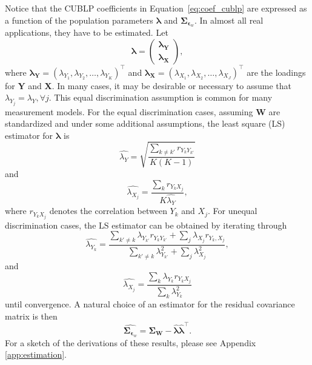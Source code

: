 \documentclass[man, floatsintext]{apa7}
\newcommand{\mbf}[1]{\bm{#1}}
\newcommand{\bX}{\mbf{X}}
\newcommand{\bY}{\mbf{Y}}
\newcommand{\beps}{\mbf{\epsilon}}
\newcommand{\blambda}{\mbf{\lambda}}
\newcommand{\bW}{\mbf{W}}
\begin{document}
  Notice that the CUBLP coefficients in Equation~\ref{eq:coef_cublp} are
  expressed as a function of the population parameters $\blambda$ and $
  \mbf{\Sigma}_{\beps_w}$. In almost all real applications, they have to be
  estimated. Let 
  \[ \blambda = \left (\begin{array}{r} \blambda_{\bY} \\
  \blambda_{\bX} \end{array} \right), \]
  where $\blambda_{\bY} = (\lambda_{Y_1},\lambda_{Y_2}, \dots, \lambda_
  {Y_K})^\top$ and $\blambda_{\bX} = (\lambda_{X_1}, \lambda_{X_2}, \dots,
  \lambda_{X_J})^\top$ are the loadings for $\bY$ and $\bX$.
  In many cases, it may be desirable or necessary to assume that $\lambda_{Y_j}
  = \lambda_Y, \forall j$. This equal discrimination assumption is common for
  many measurement models. For the equal discrimination cases, assuming $\bW$
  are standardized and under some additional assumptions, the least square (LS)
  estimator for $\blambda$ is
  \begin{equation}
    \hat{\lambda_Y} = \sqrt{\frac{\sum_{k \neq k'} r_{Y_k Y_{k'}}}{K(K-1)}}
  \end{equation}
  and
  \begin{equation}
    \hat{\lambda_{X_j}} = \frac{\sum_k r_{Y_k X_j}}{K\hat{\lambda_Y}},
  \end{equation}
  where $r_{Y_k X_j}$ denotes the correlation between $Y_k$ and $X_j$. For
  unequal discrimination cases, the LS estimator can be obtained by iterating
  through
  \begin{equation}
    \hat{\lambda_{Y_k}} = \frac{\sum_{k' \neq k} \lambda_{Y_{k'}} r_{Y_{k}Y_{k'}} +
    \sum_j \lambda_{X_j} r_{Y_k, X_j}}{\sum_{k' \neq k} \lambda_{Y_{k'}}^2 + \sum_j
    \lambda_{X_j}^2},
  \end{equation}
  and
  \begin{equation}
    \hat{\lambda_{X_j}} = \frac{\sum_k \lambda_{Y_k} r_{Y_k X_j}}{\sum_k \lambda_
    {Y_k}^2}
  \end{equation}
  until convergence. A natural choice of an estimator for the residual
  covariance matrix is then 
  \begin{equation}
    \hat{\mbf{\Sigma}_{\beps_w}} = \mbf{\Sigma}_{\bW} - \hat{\blambda} 
    \hat{\blambda}^\top.
  \end{equation}
  For a sketch of the derivations of these results, please see Appendix~
  \ref{app:estimation}.
\end{document}
